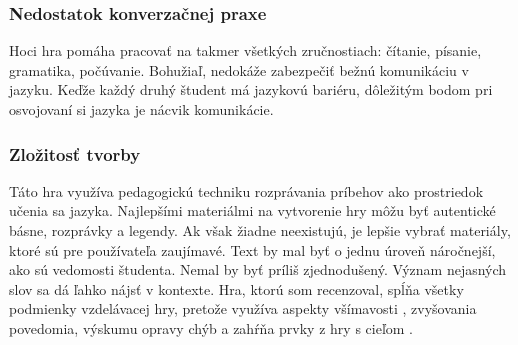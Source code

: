 \documentclass[10pt,twoside,slovak,a4paper]{article}
\begin{document}
\subsubsection{Nedostatok konverzačnej praxe}
\qquad Hoci hra pomáha pracovať na takmer všetkých zručnostiach: čítanie, písanie, gramatika, počúvanie. Bohužiaľ, nedokáže zabezpečiť bežnú komunikáciu v jazyku. Keďže každý druhý študent má jazykovú bariéru, dôležitým bodom pri osvojovaní si jazyka je nácvik komunikácie.\\

\subsubsection{Zložitosť tvorby}
\qquad Táto hra využíva pedagogickú techniku rozprávania príbehov ako prostriedok učenia sa jazyka. Najlepšími materiálmi na vytvorenie hry môžu byť autentické básne, rozprávky a legendy. Ak však žiadne neexistujú, je lepšie vybrať materiály, ktoré sú pre používateľa zaujímavé. Text by mal byť o jednu úroveň náročnejší, ako sú vedomosti študenta. Nemal by byť príliš zjednodušený. Význam nejasných slov sa dá ľahko nájsť v kontexte. \cite{BibEntry2022May} Hra, ktorú som recenzoval, spĺňa všetky podmienky vzdelávacej hry, pretože využíva aspekty všímavosti \cite{Foster2013Aug}, zvyšovania povedomia, výskumu opravy chýb \cite{Chaudron2006Oct} a zahŕňa prvky z hry s cieľom \cite{BibEntry2008Sep}.
\end{document}
